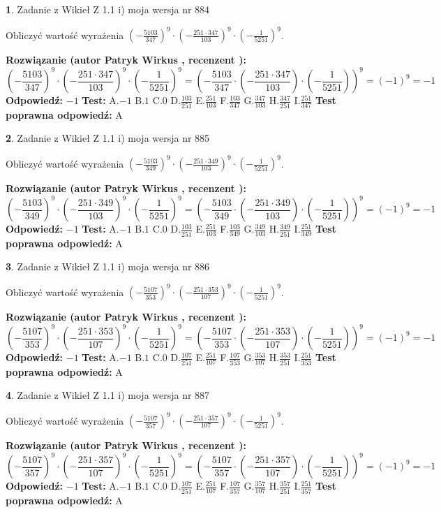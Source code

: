 \documentclass[12pt, a4paper]{article}
\theoremstyle{definition} %
\newtheorem{zad}{}
\newcommand{\zadStart}[1]{\begin{zad}#1\newline}
\newcommand{\zadStop}{\end{zad}}
\newcommand{\rozwStart}[2]{\noindent \textbf{Rozwiązanie (autor #1 , recenzent #2): }\newline}
\newcommand{\rozwStop}{\newline}
\newcommand{\odpStart}{\noindent \textbf{Odpowiedź:}\newline}
\newcommand{\odpStop}{\newline}
\newcommand{\testStart}{\noindent \textbf{Test:}\newline}
\newcommand{\testStop}{\newline}
\newcommand{\kluczStart}{\noindent \textbf{Test poprawna odpowiedź:}\newline}
\newcommand{\kluczStop}{\newline}
\begin{document}
\zadStart{Zadanie z Wikieł Z 1.1 i) moja wersja nr 884}

Obliczyć wartość wyrażenia $(-\frac{5103}{347})^{9} \cdot (-\frac{251 \cdot 347}{103})^{9} \cdot (-\frac{1}{5251})^{9}$.
\zadStop
\rozwStart{Patryk Wirkus}{}
$$(-\frac{5103}{347})^{9} \cdot (-\frac{251 \cdot 347}{103})^{9} \cdot (-\frac{1}{5251})^{9} = (-\frac{5103}{347} \cdot (-\frac{251 \cdot 347}{103}) \cdot (-\frac{1}{5251}))^{9} = (-1)^{9} = -1$$
\rozwStop
\odpStart
$-1$
\odpStop
\testStart
A.$-1$ B.$1$ C.$0$ D.$\frac{103}{251}$ E.$\frac{251}{103}$
F.$\frac{103}{347}$ G.$\frac{347}{103}$
H.$\frac{347}{251}$
I.$\frac{251}{347}$
\testStop
\kluczStart
A
\kluczStop



\zadStart{Zadanie z Wikieł Z 1.1 i) moja wersja nr 885}

Obliczyć wartość wyrażenia $(-\frac{5103}{349})^{9} \cdot (-\frac{251 \cdot 349}{103})^{9} \cdot (-\frac{1}{5251})^{9}$.
\zadStop
\rozwStart{Patryk Wirkus}{}
$$(-\frac{5103}{349})^{9} \cdot (-\frac{251 \cdot 349}{103})^{9} \cdot (-\frac{1}{5251})^{9} = (-\frac{5103}{349} \cdot (-\frac{251 \cdot 349}{103}) \cdot (-\frac{1}{5251}))^{9} = (-1)^{9} = -1$$
\rozwStop
\odpStart
$-1$
\odpStop
\testStart
A.$-1$ B.$1$ C.$0$ D.$\frac{103}{251}$ E.$\frac{251}{103}$
F.$\frac{103}{349}$ G.$\frac{349}{103}$
H.$\frac{349}{251}$
I.$\frac{251}{349}$
\testStop
\kluczStart
A
\kluczStop



\zadStart{Zadanie z Wikieł Z 1.1 i) moja wersja nr 886}

Obliczyć wartość wyrażenia $(-\frac{5107}{353})^{9} \cdot (-\frac{251 \cdot 353}{107})^{9} \cdot (-\frac{1}{5251})^{9}$.
\zadStop
\rozwStart{Patryk Wirkus}{}
$$(-\frac{5107}{353})^{9} \cdot (-\frac{251 \cdot 353}{107})^{9} \cdot (-\frac{1}{5251})^{9} = (-\frac{5107}{353} \cdot (-\frac{251 \cdot 353}{107}) \cdot (-\frac{1}{5251}))^{9} = (-1)^{9} = -1$$
\rozwStop
\odpStart
$-1$
\odpStop
\testStart
A.$-1$ B.$1$ C.$0$ D.$\frac{107}{251}$ E.$\frac{251}{107}$
F.$\frac{107}{353}$ G.$\frac{353}{107}$
H.$\frac{353}{251}$
I.$\frac{251}{353}$
\testStop
\kluczStart
A
\kluczStop



\zadStart{Zadanie z Wikieł Z 1.1 i) moja wersja nr 887}

Obliczyć wartość wyrażenia $(-\frac{5107}{357})^{9} \cdot (-\frac{251 \cdot 357}{107})^{9} \cdot (-\frac{1}{5251})^{9}$.
\zadStop
\rozwStart{Patryk Wirkus}{}
$$(-\frac{5107}{357})^{9} \cdot (-\frac{251 \cdot 357}{107})^{9} \cdot (-\frac{1}{5251})^{9} = (-\frac{5107}{357} \cdot (-\frac{251 \cdot 357}{107}) \cdot (-\frac{1}{5251}))^{9} = (-1)^{9} = -1$$
\rozwStop
\odpStart
$-1$
\odpStop
\testStart
A.$-1$ B.$1$ C.$0$ D.$\frac{107}{251}$ E.$\frac{251}{107}$
F.$\frac{107}{357}$ G.$\frac{357}{107}$
H.$\frac{357}{251}$
I.$\frac{251}{357}$
\testStop
\kluczStart
A
\kluczStop
\end{document}

